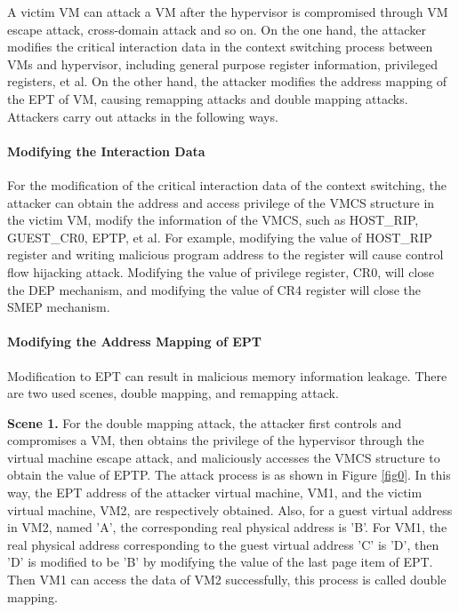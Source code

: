 \documentclass[conference]{IEEEtran}
\begin{document}
A victim VM can attack a VM after the hypervisor is compromised through VM escape attack, cross-domain attack and so on.
On the one hand, the attacker modifies the critical interaction data in the context switching process between VMs and hypervisor, including general purpose register information, privileged registers, et al. On the other hand, the attacker modifies the address mapping of the EPT of VM, causing remapping attacks and double mapping attacks. Attackers carry out attacks in the following ways.

\paragraph{Modifying the Interaction Data}
For the modification of the critical interaction data of the context switching, the attacker can obtain the address and access privilege of the VMCS structure in the victim VM, modify the information of the VMCS, such as HOST\_RIP, GUEST\_CR0, EPTP, et al. For example, modifying the value of HOST\_RIP register and writing malicious program address to the register will cause control flow hijacking attack. Modifying the value of privilege register, CR0, will close the DEP mechanism, and modifying the value of CR4 register will close the SMEP mechanism.

\paragraph{Modifying the Address Mapping of EPT}
Modification to EPT can result in malicious memory information leakage. There are two used scenes, double mapping, and remapping attack.

\textbf{Scene 1.} 
    For the double mapping attack, the attacker first controls and compromises a VM, then obtains the privilege of the hypervisor through the virtual machine escape attack, and maliciously accesses the VMCS structure to obtain the value of EPTP. The attack process is as shown in Figure \ref{fig0}. In this way, the EPT address of the attacker virtual machine, VM1, and the victim virtual machine, VM2, are respectively obtained. Also, for a guest virtual address in VM2, named 'A', the corresponding real physical address is 'B'. For VM1, the real physical address corresponding to the guest virtual address 'C' is 'D', then 'D' is modified to be 'B' by modifying the value of the last page item of EPT. Then VM1 can access the data of VM2 successfully, this process is called double mapping.
\end{document}
